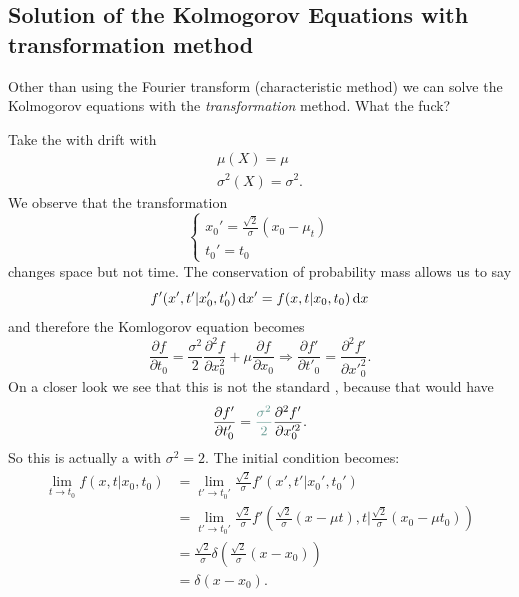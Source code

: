 \documentclass[12pt]{report}
\begin{document}
\subsection{Solution of the Kolmogorov Equations with transformation method}
Other than using the Fourier transform (characteristic method) we can solve the Kolmogorov equations with the \emph{transformation} method. What the fuck?\par
Take the \bwm{} with drift with
\begin{equation*}
	\begin{array}{c}
		\mu(X)=\mu\\
		\sigma^{2}(X)=\sigma^{2}.
	\end{array}
\end{equation*}
We observe that the transformation 
\begin{equation*}
	\begin{cases}
		x_{0}'=\frac{\sqrt{2}}{\sigma}(x_{0}-\mu_t)\\
		t_{0}'=t_{0}
	\end{cases}
\end{equation*}
changes space but not time. The conservation of probability mass allows us to say
\begin{equation*}
	f'(x',t'|x_{0}',t_{0}')\mathop{}\!\mathrm{d} x'=f(x,t|x_{0},t_{0})\mathop{}\!\mathrm{d} x
\end{equation*}
and therefore the Komlogorov equation becomes
\begin{equation*}
	\frac{\partial f}{\partial t_{0}}=\frac{\sigma^{2}}{2}\frac{\partial^{2}f}{\partial x_{0}^{2}}+\mu\frac{\partial f}{\partial x_{0}}\Longrightarrow\frac{\partial f'}{\partial t'_{0}}=\frac{\partial^{2}f'}{\partial x'^{2}_{0}}.
\end{equation*}
On a closer look we see that this is not the standard \bwm, because that would have
\begin{equation*}
	\frac{\partial f'}{\partial t'_{0}}=\mathcolor{SeaGreen2!53!MediumOrchid4}{\frac{\sigma^{2}}{2}}\frac{\partial^{2}f'}{\partial x'^{2}_{0}}.
\end{equation*}
So this is actually a \bwm{} with $\sigma^{2}=2$. The initial condition becomes:
\begin{align*}
	\lim_{t\to t_0}f(x,t|x_{0},t_{0})&=\lim_{t'\to t_{0}'}\frac{\sqrt{2}}{\sigma}f'(x',t'|x_{0}',t_{0}')\\
	&=\lim_{t'\to t_{0}'}\frac{\sqrt{2}}{\sigma}f'\left(\frac{\sqrt{2}}{\sigma}(x-\mu t),t\Big|\frac{\sqrt{2}}{\sigma}(x_{0}-\mu t_{0})\right)\\
	&=\frac{\sqrt{2}}{\sigma}\delta\left(\frac{\sqrt{2}}{\sigma}(x-x_{0})\right)\\
	&=\delta(x-x_{0}).
\end{align*}
\end{document}
